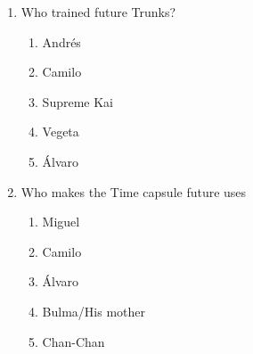 \documentclass[letterpaper,addpoints,answers,twocolumn,10pt]{exam}
\begin{document}
\begin{enumerate}[leftmargin=.2in]
\begin{enumerate}[noitemsep,leftmargin=0in]
\end{enumerate}



\item  Who trained future Trunks?


\begin{enumerate}[noitemsep,leftmargin=0in]


\item  Andrés
\item  Camilo
\item  Supreme Kai
\item  Vegeta
\item  Álvaro


\end{enumerate}



\item  Who makes the Time capsule future uses


\begin{enumerate}[noitemsep,leftmargin=0in]


\item  Miguel
\item  Camilo
\item  Álvaro
\item  Bulma/His mother
\item  Chan-Chan


\end{enumerate}



\end{enumerate}
\end{document}
